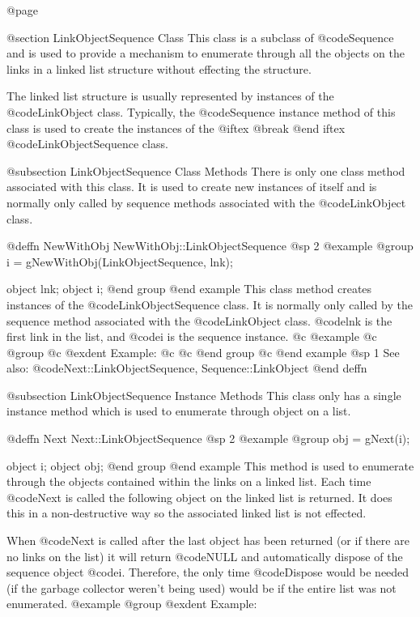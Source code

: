 @page

@section LinkObjectSequence Class
This class is a subclass of @code{Sequence} and is used to provide a
mechanism to enumerate through all the objects on the links in a linked
list structure without effecting the structure.

The linked list structure is usually represented by instances of the
@code{LinkObject} class.  Typically, the @code{Sequence} instance method
of this class is used to create the instances of the
@iftex 
@break 
@end iftex
@code{LinkObjectSequence} class.



@subsection LinkObjectSequence Class Methods
There is only one class method associated with this class.  It is used
to create new instances of itself and is normally only called by
sequence methods associated with the @code{LinkObject} class.





@deffn {NewWithObj} NewWithObj::LinkObjectSequence
@sp 2
@example
@group
i = gNewWithObj(LinkObjectSequence, lnk);

object  lnk;
object  i;
@end group
@end example
This class method creates instances of the @code{LinkObjectSequence}
class.  It is normally only called by the sequence method associated
with the @code{LinkObject} class.  @code{lnk} is the first link in the
list, and @code{i} is the sequence instance.
@c @example
@c @group
@c @exdent Example:
@c 
@c @end group
@c @end example
@sp 1
See also:  @code{Next::LinkObjectSequence, Sequence::LinkObject}
@end deffn




@subsection LinkObjectSequence Instance Methods
This class only has a single instance method which is used to enumerate
through object on a list.






@deffn {Next} Next::LinkObjectSequence
@sp 2
@example
@group
obj = gNext(i);

object  i;
object  obj;
@end group
@end example
This method is used to enumerate through the objects contained within
the links on a linked list.  Each time @code{Next} is called the
following object on the linked list is returned.  It does this in a
non-destructive way so the associated linked list is not effected.

When @code{Next} is called after the last object has been returned (or
if there are no links on the list) it will return @code{NULL} and
automatically dispose of the sequence object @code{i}.  Therefore,
the only time @code{Dispose} would be needed (if the garbage collector
weren't being used) would be if the entire list was not enumerated.
@example
@group
@exdent Example:

